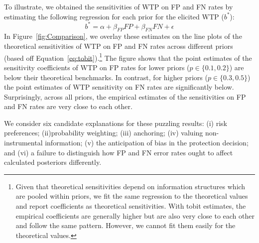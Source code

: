 \documentclass[12pt,a4paper]{article}
\newcommand{\agt}[1]{{\color{OliveGreen}#1}}
\begin{document}
\bigskip

To illustrate, we obtained the sensitivities of WTP on FP and FN rates by estimating the following regression for each prior for the elicited WTP ($b^*$):
\begin{equation}
\label{eq:tobit}
b^* = \alpha+\beta_{FP} FP +\beta_{FN} FN+\epsilon
\end{equation}
In Figure~\ref{fig:Comparison}, we overlay these estimates on the line plots of the theoretical sensitivities of WTP on FP and FN rates across different priors (based off Equation~\ref{eq:tobit}).\footnote{Given that theoretical sensitivities depend on information structures which are pooled within priors, we fit the same regression to the theoretical values and report coefficients as theoretical sensitivities. With tobit estimates, the empirical coefficients are generally higher but are also very close to each other and follow the same pattern.  However, we cannot fit them easily for the theoretical values.} The figure shows that the point estimates of the sensitivity coefficients of WTP on FP rates for lower priors ($p \in \{0.1, 0.2\}$) are below their theoretical benchmarks. In contrast, for higher priors ($p \in \{0.3, 0.5\}$) the point estimates of WTP sensitivity on FN rates  are significantly below. Surprisingly, across all priors, the empirical estimates of the sensitivities on FP and FN rates are very close to each other.


We consider six candidate explanations for these puzzling results: (i) risk preferences; (ii)probability weighting; (iii)  anchoring; (iv) valuing non-instrumental information; (v) the anticipation of bias in the protection decision; and (vi) a failure to distinguish how FP and FN error rates ought to affect calculated posteriors differently. 
\end{document}
